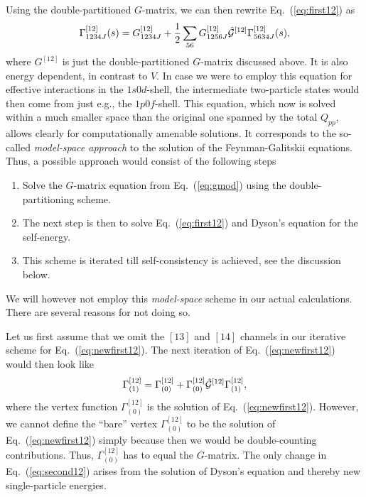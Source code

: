 \documentclass[twoside,12pt]{article}
\begin{document}
Using the double-partitioned $G$-matrix, we can then rewrite
Eq.\ (\ref{eq:first12}) as
\begin{equation}
      \Gamma^{[12]}_{1234J}(s) =
      G^{[12]}_{1234J}+\frac{1}{2}
      \sum_{56}
      G^{[12]}_{1256J}\hat{{\cal G}}^{[12]}
      \Gamma^{[12]}_{5634J}(s),
      \label{eq:newfirst12}
\end{equation}
where $G^{[12]}$ is just the double-partitioned $G$-matrix
discussed above. It is also energy dependent,
in contrast to $V$.
In case we were to employ this equation for effective
interactions in the $1s0d$-shell, the intermediate two-particle
states would then come from just e.g., the $1p0f$-shell.
This equation, which now is solved within a much smaller space
than the original one spanned by the total $Q_{pp}$, allows
clearly for computationally amenable solutions. It corresponds
to the so-called {\em model-space approach} to the solution
of the Feynman-Galitskii equations.
Thus, a possible approach would consist
of the following steps
\begin{enumerate}
\item Solve the $G$-matrix equation from Eq.\ (\ref{eq:gmod})
      using the double-partitioning scheme.
\item The next step is then to solve Eq.\ (\ref{eq:first12})
      and Dyson's equation for the self-energy.
\item This scheme is iterated till self-consistency is achieved,
      see the discussion below.
\end{enumerate}

We will however not employ this {\em model-space} scheme in our
actual calculations. There are several reasons for not doing so.

Let us first assume that we omit the $[13]$ and $[14]$ channels in our
iterative scheme for Eq.\ (\ref{eq:newfirst12}).
The next iteration of Eq.\ (\ref{eq:newfirst12})
would then look like
\begin{equation}
      \Gamma^{[12]}_{(1)} =
      \Gamma_{(0)}^{[12]}+
      \Gamma_{(0)}^{[12]}
       \hat{{\cal G}}^{[12]}\Gamma^{[12]}_{(1)},
      \label{eq:second12}
\end{equation}
where the vertex function $\Gamma_{(0)}^{[12]}$ is the solution
of Eq.\ (\ref{eq:newfirst12}). However, we cannot define
the ``bare'' vertex $\Gamma_{(0)}^{[12]}$ to be the
solution  of Eq.\ (\ref{eq:newfirst12}) simply because then we
would be double-counting contributions.
Thus, $\Gamma_{(0)}^{[12]}$ has to equal the $G$-matrix.
The only change in Eq.\ (\ref{eq:second12})
arises from the solution of Dyson's equation
and thereby new single-particle energies.
\end{document}
